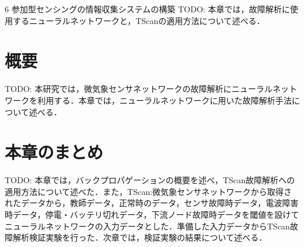 \chapterhead
{6}
{参加型センシングの情報収集システムの構築}
{TODO: 本章では，故障解析に使用するニューラルネットワークと，TScanの適用方法について述べる．}

\newpage
\section{概要}
TODO: 本研究では，微気象センサネットワークの故障解析にニューラルネットワークを利用する．本章では，ニューラルネットワークに用いた故障解析手法について述べる．

\newpage

\section{本章のまとめ}
TODO: 本章では，バックプロパゲーションの概要を述べ，TScan故障解析への適用方法について述べた．また，TScan:微気象センサネットワークから取得されたデータから，教師データ，正常時のデータ，センサ故障時データ，電波障害時データ，停電・バッテリ切れデータ，下流ノード故障時データを閾値を設けてニューラルネットワークの入力データとした．準備した入力データからTScan故障解析検証実験を行った．次章では，検証実験の結果について述べる．
\newpage
